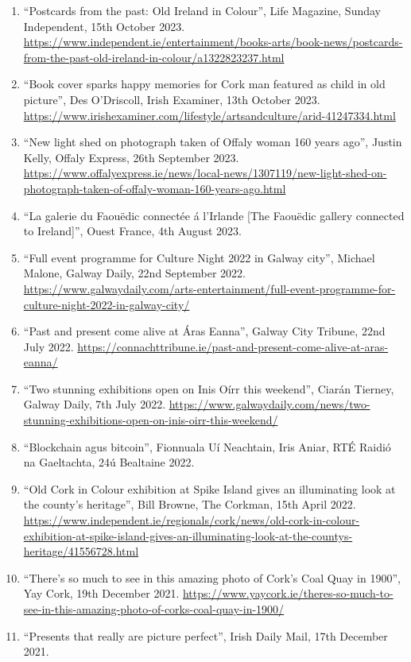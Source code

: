 \documentclass[10pt,a4paper]{res} %
\begin{document}
\begin{resume}
{\begin{enumerate}
\item ``Postcards from the past: Old Ireland in Colour'', Life Magazine, Sunday Independent, 15th October 2023. \url{https://www.independent.ie/entertainment/books-arts/book-news/postcards-from-the-past-old-ireland-in-colour/a1322823237.html}
\item ``Book cover sparks happy memories for Cork man featured as child in old picture'', Des O'Driscoll, Irish Examiner, 13th October 2023. \url{https://www.irishexaminer.com/lifestyle/artsandculture/arid-41247334.html}
\item ``New light shed on photograph taken of Offaly woman 160 years ago'', Justin Kelly, Offaly Express, 26th September 2023. \url{https://www.offalyexpress.ie/news/local-news/1307119/new-light-shed-on-photograph-taken-of-offaly-woman-160-years-ago.html}
\item ``La gale­rie du Faou\"{e}dic connec­t\'{e}e \'{a} l'Irlande [The Faou\"{e}dic gallery connected to Ireland]'', Ouest France, 4th August 2023.
\item ``Full event programme for Culture Night 2022 in Galway city'', Michael Malone, Galway Daily, 22nd September 2022. \url{https://www.galwaydaily.com/arts-entertainment/full-event-programme-for-culture-night-2022-in-galway-city/}
\item ``Past and present come alive at \'{A}ras Eanna'', Galway City Tribune, 22nd July 2022. \url{https://connachttribune.ie/past-and-present-come-alive-at-aras-eanna/}
\item ``Two stunning exhibitions open on Inis O\'{i}rr this weekend'', Ciar\'{a}n Tierney, Galway Daily, 7th July 2022. \url{https://www.galwaydaily.com/news/two-stunning-exhibitions-open-on-inis-oirr-this-weekend/}
\item ``Blockchain agus bitcoin'', Fionnuala U\'{i} Neachtain, Iris Aniar, RT\'{E} Raidi\'{o} na Gaeltachta, 24\'{u} Bealtaine 2022.
\item ``Old Cork in Colour exhibition at Spike Island gives an illuminating look at the county's heritage'', Bill Browne, The Corkman, 15th April 2022. \url{https://www.independent.ie/regionals/cork/news/old-cork-in-colour-exhibition-at-spike-island-gives-an-illuminating-look-at-the-countys-heritage/41556728.html}
\item ``There's so much to see in this amazing photo of Cork's Coal Quay in 1900'', Yay Cork, 19th December 2021. \url{https://www.yaycork.ie/theres-so-much-to-see-in-this-amazing-photo-of-corks-coal-quay-in-1900/}
\item ``Presents that really are picture perfect'', Irish Daily Mail, 17th December 2021.

\end{enumerate}}
\end{resume}
\end{document}
